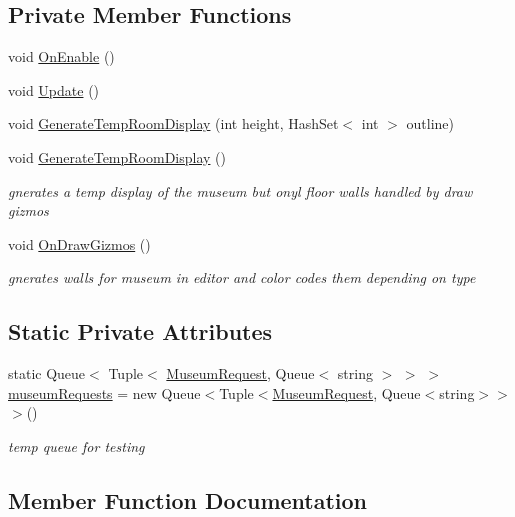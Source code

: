 \subsection*{Private Member Functions}
\begin{DoxyCompactItemize}
\item 
void \mbox{\hyperlink{class_museum_generator_abc3127d3a23107a350064fc49c5495c1}{On\+Enable}} ()
\item 
void \mbox{\hyperlink{class_museum_generator_afa0b7c3e8ab1bccedc4c7828cbf4724e}{Update}} ()
\item 
void \mbox{\hyperlink{class_museum_generator_a65ac409691646fa2f92ee9b84294ac57}{Generate\+Temp\+Room\+Display}} (int height, Hash\+Set$<$ int $>$ outline)
\item 
void \mbox{\hyperlink{class_museum_generator_a1b9419222535f317005ca9fe1fe757f3}{Generate\+Temp\+Room\+Display}} ()
\begin{DoxyCompactList}\small\item\em gnerates a temp display of the museum but onyl floor walls handled by draw gizmos \end{DoxyCompactList}\item 
void \mbox{\hyperlink{class_museum_generator_a7c219625d39af0857271734995728a10}{On\+Draw\+Gizmos}} ()
\begin{DoxyCompactList}\small\item\em gnerates walls for museum in editor and color codes them depending on type \end{DoxyCompactList}\end{DoxyCompactItemize}
\subsection*{Static Private Attributes}
\begin{DoxyCompactItemize}
\item 
static Queue$<$ Tuple$<$ \mbox{\hyperlink{class_museum_request}{Museum\+Request}}, Queue$<$ string $>$ $>$ $>$ \mbox{\hyperlink{class_museum_generator_a5295b75989f837f22b5d3de571061572}{museum\+Requests}} = new Queue$<$Tuple$<$\mbox{\hyperlink{class_museum_request}{Museum\+Request}}, Queue$<$string$>$$>$$>$()
\begin{DoxyCompactList}\small\item\em temp queue for testing \end{DoxyCompactList}\end{DoxyCompactItemize}


\subsection{Member Function Documentation}
\mbox{\label{class_museum_generator_a65ac409691646fa2f92ee9b84294ac57}} 
